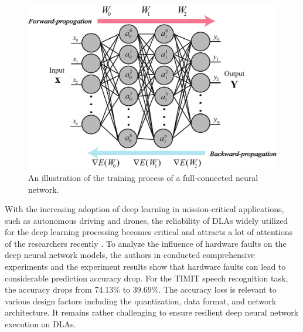 \begin{figure}
    \centering
    \includegraphics[width=0.7\linewidth]{images/OL-fig2}
    \caption{An illustration of the training process of a full-connected neural network.}
    \label{fig:networktraining}
    \vspace{-15pt}
\end{figure}

With the increasing adoption of deep learning in mission-critical applications, such as autonomous driving and drones, the reliability of DLAs widely utilized for the deep learning processing becomes critical and attracts a lot of attentions of the researchers recently \cite{mittal2020survey} \cite{xu2021reliability} \cite{xu2020persistent} \cite{ning2020ftt}. To analyze the influence of hardware faults on the deep neural network models, the authors in \cite{zhang2019fault} conducted comprehensive experiments and the experiment results show that hardware faults can lead to considerable prediction accuracy drop. For the TIMIT speech recognition task, the accuracy drops from 74.13$\%$ to 39.69$\%$. The accuracy loss is relevant to various design factors including the quantization, data format, and network architecture. It remains rather challenging to ensure resilient deep neural network execution on DLAs.

